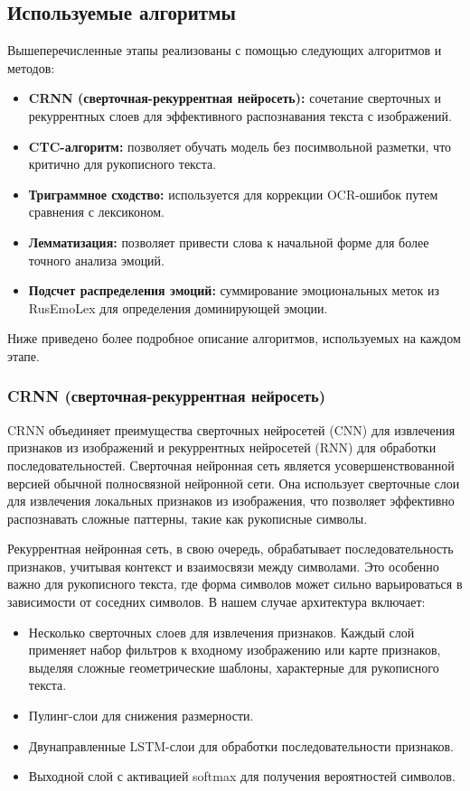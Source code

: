 \documentclass[12pt,a4paper]{article}
\begin{document}
\subsection{Используемые алгоритмы}

Вышеперечисленные этапы реализованы с помощью следующих алгоритмов и методов:
\begin{itemize}
    \item \textbf{CRNN (сверточная-рекуррентная нейросеть):} сочетание сверточных и рекуррентных слоев для эффективного распознавания текста с изображений.
    \item \textbf{CTC-алгоритм:} позволяет обучать модель без посимвольной разметки, что критично для рукописного текста.
    \item \textbf{Триграммное сходство:} используется для коррекции OCR-ошибок путем сравнения с лексиконом.
    \item \textbf{Лемматизация:} позволяет привести слова к начальной форме для более точного анализа эмоций.
    \item \textbf{Подсчет распределения эмоций:} суммирование эмоциональных меток из RusEmoLex для определения доминирующей эмоции.
\end{itemize}

Ниже приведено более подробное описание алгоритмов, используемых на каждом этапе.

\subsubsection{CRNN (сверточная-рекуррентная нейросеть)}
CRNN объединяет преимущества сверточных нейросетей (CNN) для извлечения признаков
из изображений и рекуррентных нейросетей (RNN) для обработки последовательностей.
Сверточная нейронная сеть является усовершенствованной версией обычной полносвязной
нейронной сети. Она использует сверточные слои для извлечения локальных признаков из
изображения, что позволяет эффективно распознавать сложные паттерны, такие как
рукописные символы.

Рекуррентная нейронная сеть, в свою очередь, обрабатывает последовательность признаков,
учитывая контекст и взаимосвязи между символами. Это особенно важно для рукописного текста,
где форма символов может сильно варьироваться в зависимости от соседних символов.
В нашем случае архитектура включает:

\begin{itemize}
    \item Несколько сверточных слоев для извлечения признаков. Каждый слой применяет набор
    фильтров к входному изображению или карте признаков, выделяя сложные геометрические шаблоны,
    характерные для рукописного текста.
    \item Пулинг-слои для снижения размерности.
    \item Двунаправленные LSTM-слои для обработки последовательности признаков.
    \item Выходной слой с активацией softmax для получения вероятностей символов.
\end{itemize}
\end{document}
